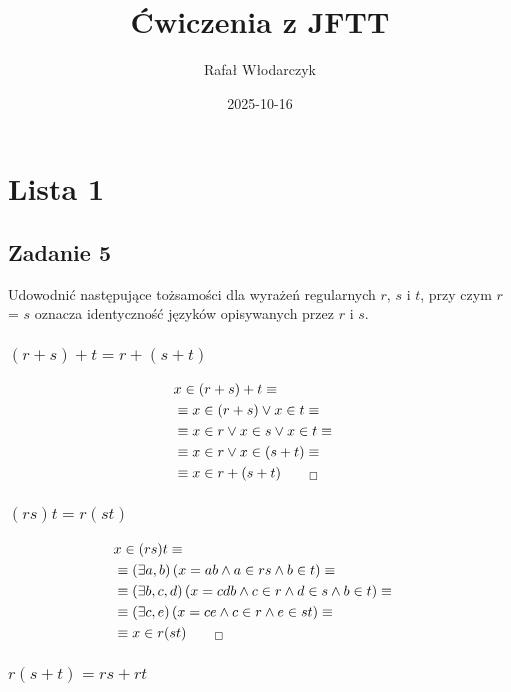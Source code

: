 \documentclass[12pt]{article}
\title{Ćwiczenia z JFTT}
\author{Rafał Włodarczyk}
\date{2025-10-16}
\begin{document}
\maketitle

\section{Lista 1}

\setcounter{subsection}{4}
\subsection{Zadanie 5}

Udowodnić następujące tożsamości dla wyrażeń regularnych $r$, $s$ i $t$, 
przy czym $r$ = $s$ oznacza identyczność języków opisywanych przez $r$ i $s$.

\subsubsection{$(r+s)+t=r+(s+t)$}

\begin{align}
    &x\in (r+s)+t \equiv&\\
    &\equiv x\in (r+s) \lor x \in t \equiv\\
    &\equiv x\in r \lor x \in s \lor x \in t \equiv\\
    &\equiv x\in r \lor x \in (s+t) \equiv\\
    &\equiv x\in r+(s+t)_{\qed}
\end{align}

\subsubsection{$(rs)t=r(st)$}

\begin{align}
    &x\in (rs)t \equiv&\\
    &\equiv \left(\exists a,b \right)\left(x=ab \land a\in rs \land b\in t\right) \equiv\\
    &\equiv \left(\exists b,c,d \right)\left(x=cdb \land c\in r \land d\in s \land b\in t\right) \equiv\\
    &\equiv \left(\exists c,e \right)\left(x=ce \land c\in r \land e\in st\right) \equiv\\
    &\equiv x\in r(st)_{\qed}
\end{align}

\subsubsection{$r(s+t)=rs+rt$}
\end{document}
